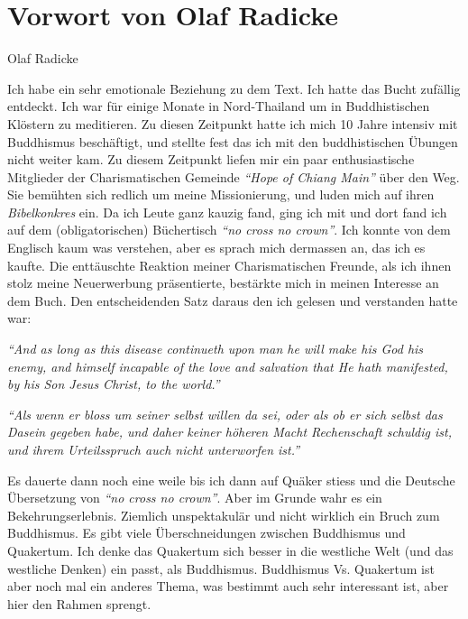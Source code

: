 \part{Vorwort von Olaf Radicke}



\begin{flushright}
\begin{footnotesize}
Olaf Radicke
\end{footnotesize}
\end{flushright}
\smallskip

Ich habe ein sehr emotionale Beziehung zu dem Text. Ich hatte das Bucht zufällig
entdeckt. Ich war für einige Monate in Nord-Thailand um in Buddhistischen
Klöstern zu meditieren. Zu diesen Zeitpunkt hatte ich mich 10 Jahre intensiv mit
Buddhismus beschäftigt, und stellte fest das ich mit den buddhistischen Übungen
nicht weiter kam. Zu diesem Zeitpunkt liefen mir ein paar enthusiastische
Mitglieder der Charismatischen Gemeinde \textit{"`Hope of Chiang Main"'} über
den Weg. Sie bemühten sich redlich um meine Missionierung, und luden mich auf
ihren \textit{Bibelkonkres} ein. Da ich Leute ganz kauzig fand, ging ich mit und
dort fand ich auf dem (obligatorischen) Büchertisch \textit{"`no cross no
crown"'}.
Ich konnte von dem Englisch kaum was verstehen, aber es sprach mich dermassen
an, das ich es kaufte. Die enttäuschte Reaktion meiner Charismatischen Freunde,
als ich ihnen stolz meine Neuerwerbung präsentierte, bestärkte mich in meinen
Interesse an dem Buch. Den entscheidenden Satz daraus den ich gelesen und
verstanden hatte war:

\begin{center}
\parbox{7,5cm}{
\textit{"`And as long as this disease continueth upon man he will make his God
his enemy, and himself incapable of the love and salvation that He hath
manifested, by his Son Jesus Christ, to the world."'}

\medskip

\textit{"`Als wenn er bloss um seiner selbst willen da sei, oder als ob er
sich selbst das Dasein gegeben habe, und daher keiner höheren Macht Rechenschaft
schuldig ist, und ihrem Urteilsspruch auch nicht unterworfen ist."'}
}
\end{center}

\medskip

Es dauerte dann noch eine weile bis ich dann auf Quäker stiess und die Deutsche
Übersetzung von \textit{"`no cross no crown"'}. Aber im Grunde wahr es ein
Bekehrungserlebnis. Ziemlich unspektakulär und nicht wirklich ein Bruch zum
Buddhismus. Es gibt viele Überschneidungen zwischen Buddhismus und Quakertum.
Ich denke das Quakertum sich besser in die westliche Welt (und das westliche
Denken) ein passt, als Buddhismus. Buddhismus Vs. Quakertum ist aber noch mal
ein anderes Thema, was bestimmt auch sehr interessant ist, aber hier den Rahmen
sprengt.

